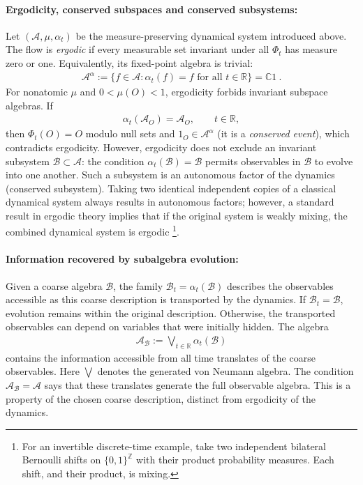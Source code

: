 \documentclass[a4paper,11pt]{article}
\theoremstyle{definition}
\newcommand{\mA}{\mathcal{A}}
\newcommand{\mB}{\mathcal{B}}
\begin{document}
\paragraph{Ergodicity, conserved subspaces and conserved subsystems:}
Let $(\mA,\mu,\alpha_t)$ be the measure-preserving dynamical system introduced above. The flow is {\it ergodic} if every measurable set invariant under all $\Phi_t$ has measure zero or one. Equivalently, its fixed-point algebra is trivial:
\begin{align}
    \mA^\alpha
    :=\{f\in\mA:\alpha_t(f)=f\text{ for all }t\in\mathbb R\}
    =\mathbb C1\ .
\end{align}
For nonatomic $\mu$ and $0<\mu(O)<1$, ergodicity forbids invariant subspace algebras. If 
\begin{align}
    \alpha_t(\mA_O)=\mA_O,\qquad t\in\mathbb R,
\end{align}
then $\Phi_t(O)=O$ modulo null sets and $1_O\in\mA^\alpha$ (it is a {\it conserved event}), which contradicts ergodicity. However, ergodicity does not exclude an invariant subsystem $\mB\subset\mA$: the condition $\alpha_t(\mB)=\mB$ permits observables in $\mB$ to evolve into one another. Such a subsystem is an autonomous factor of the dynamics (conserved subsystem). Taking two identical independent copies of a classical dynamical system always results in autonomous factors; however, a standard result in ergodic theory implies that if the original system is weakly mixing, the combined dynamical system is ergodic \footnote{For an invertible discrete-time example, take two independent bilateral Bernoulli shifts on $\{0,1\}^{\mathbb Z}$ with their product probability measures. Each shift, and their product, is mixing.}.

\paragraph{Information recovered by subalgebra evolution:}
Given a coarse algebra $\mB$, the family $\mB_t=\alpha_t(\mB)$ describes the observables accessible as this coarse description is transported by the dynamics. If $\mB_t=\mB$, evolution remains within the original description. Otherwise, the transported observables can depend on variables that were initially hidden. The algebra
\begin{align}
    \mA_{\mB}:=\bigvee_{t\in\mathbb R}\alpha_t(\mB)
\end{align}
contains the information accessible from all time translates of the coarse observables. Here $\bigvee$ denotes the generated von Neumann algebra. The condition $\mA_{\mB}=\mA$ says that these translates generate the full observable algebra. This is a property of the chosen coarse description, distinct from ergodicity of the dynamics.
\end{document}

